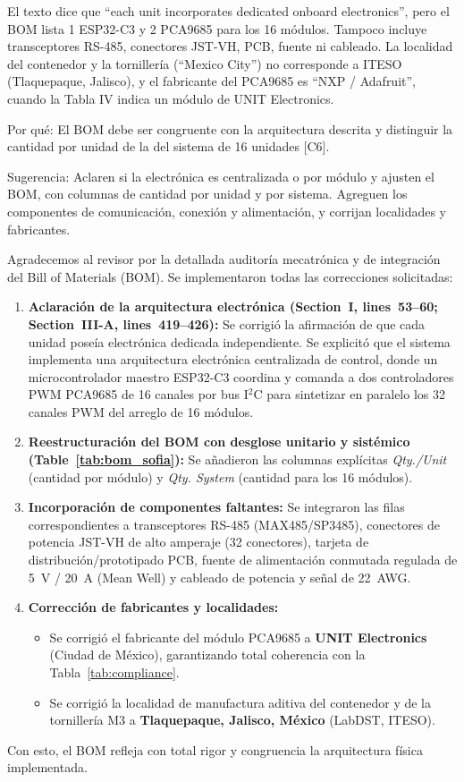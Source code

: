 \documentclass{LabDSTresponse}
\begin{document}
{El texto dice que “each unit incorporates dedicated onboard electronics”, pero el BOM lista 1 ESP32-C3 y 2 PCA9685 para los 16 módulos. Tampoco incluye transceptores RS-485, conectores JST-VH, PCB, fuente ni cableado. La localidad del contenedor y la tornillería (“Mexico City”) no corresponde a ITESO (Tlaquepaque, Jalisco), y el fabricante del PCA9685 es “NXP / Adafruit”, cuando la Tabla IV indica un módulo de UNIT Electronics.

Por qué: El BOM debe ser congruente con la arquitectura descrita y distinguir la cantidad por unidad de la del sistema de 16 unidades [C6].

Sugerencia: Aclaren si la electrónica es centralizada o por módulo y ajusten el BOM, con columnas de cantidad por unidad y por sistema. Agreguen los componentes de comunicación, conexión y alimentación, y corrijan localidades y fabricantes.}
{Agradecemos al revisor por la detallada auditoría mecatrónica y de integración del Bill of Materials (BOM). Se implementaron todas las correcciones solicitadas:
\begin{enumerate}
    \item \textbf{Aclaración de la arquitectura electrónica (Section~I, lines~53--60; Section~III-A, lines~419--426):} Se corrigió la afirmación de que cada unidad poseía electrónica dedicada independiente. Se explicitó que el sistema implementa una arquitectura electrónica centralizada de control, donde un microcontrolador maestro ESP32-C3 coordina y comanda a dos controladores PWM PCA9685 de 16 canales por bus I$^2$C para sintetizar en paralelo los 32 canales PWM del arreglo de 16 módulos.
    \item \textbf{Reestructuración del BOM con desglose unitario y sistémico (Table~\ref{tab:bom_sofia}):} Se añadieron las columnas explícitas \textit{Qty./Unit} (cantidad por módulo) y \textit{Qty. System} (cantidad para los 16 módulos).
    \item \textbf{Incorporación de componentes faltantes:} Se integraron las filas correspondientes a transceptores RS-485 (MAX485/SP3485), conectores de potencia JST-VH de alto amperaje (32 conectores), tarjeta de distribución/prototipado PCB, fuente de alimentación conmutada regulada de 5~V / 20~A (Mean Well) y cableado de potencia y señal de 22~AWG.
    \item \textbf{Corrección de fabricantes y localidades:}
    \begin{itemize}
        \item Se corrigió el fabricante del módulo PCA9685 a \textbf{UNIT Electronics} (Ciudad de México), garantizando total coherencia con la Tabla~\ref{tab:compliance}.
        \item Se corrigió la localidad de manufactura aditiva del contenedor y de la tornillería M3 a \textbf{Tlaquepaque, Jalisco, México} (LabDST, ITESO).
    \end{itemize}
\end{enumerate}
Con esto, el BOM refleja con total rigor y congruencia la arquitectura física implementada.}
\end{document}
